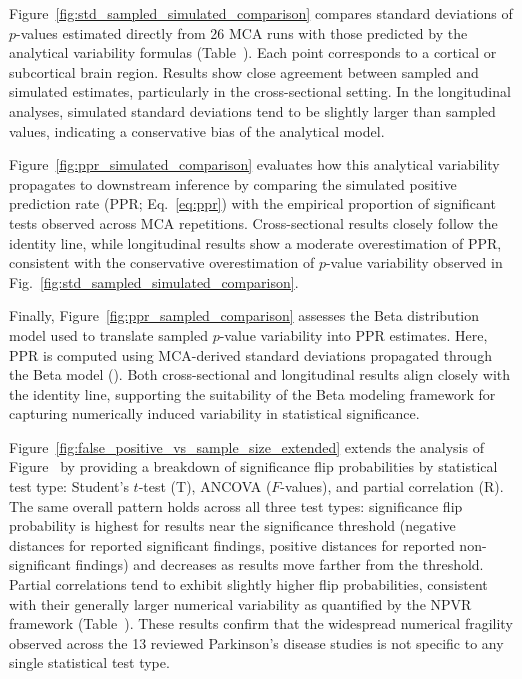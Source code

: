 Figure~\ref{fig:std_sampled_simulated_comparison} compares standard deviations
of $p$-values estimated directly from 26 MCA runs with those predicted by the
analytical variability formulas (Table~).
Each point corresponds to a cortical or subcortical brain region. Results show
close agreement between sampled and simulated estimates, particularly in the
cross-sectional setting. In the longitudinal analyses, simulated standard
deviations tend to be slightly larger than sampled values, indicating a
conservative bias of the analytical model.

Figure~\ref{fig:ppr_simulated_comparison} evaluates how this analytical
variability propagates to downstream inference by comparing the simulated
positive prediction rate (PPR; Eq.~\ref{eq:ppr}) with the empirical proportion
of significant tests observed across MCA repetitions. Cross-sectional results
closely follow the identity line, while longitudinal results show a moderate
overestimation of PPR, consistent with the conservative overestimation of
$p$-value variability observed in
Fig.~\ref{fig:std_sampled_simulated_comparison}.

Finally, Figure~\ref{fig:ppr_sampled_comparison} assesses the Beta distribution
model used to translate sampled $p$-value variability into PPR estimates. Here,
PPR is computed using MCA-derived standard deviations propagated through the
Beta model (). Both cross-sectional and
longitudinal results align closely with the identity line, supporting the
suitability of the Beta modeling framework for capturing numerically induced
variability in statistical significance.

Figure~\ref{fig:false_positive_vs_sample_size_extended} extends the analysis of
Figure~ by providing a
breakdown of significance flip probabilities by statistical test type:
Student's $t$-test (T), ANCOVA ($F$-values), and partial correlation (R). The
same overall pattern holds across all three test types: significance flip
probability is highest for results near the significance threshold (negative
distances for reported significant findings, positive distances for reported
non-significant findings) and decreases as results move farther from the
threshold. Partial correlations tend to exhibit slightly higher flip
probabilities, consistent with their generally larger numerical variability as
quantified by the NPVR framework (Table~).
These results confirm that the widespread numerical fragility observed across
the 13 reviewed Parkinson's disease studies is not specific to any single
statistical test type.

